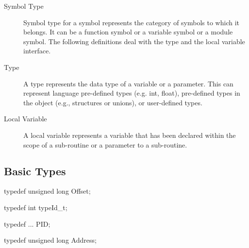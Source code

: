 \begin{description}
\item[Symbol Type] Symbol type for a symbol represents the category of symbols to which it belongs. It can be a function symbol or a variable symbol or a module symbol.
The following definitions deal with the type and the local variable interface.
\item[Type] A type represents the data type of a variable or a parameter. This can represent language pre-defined types (e.g. int, float), pre-defined types in the object (e.g., structures or unions), or user-defined types.
\item[Local Variable] A local variable represents a variable that has been declared within the scope of a sub-routine or a parameter to a sub-routine.
\end{description}

\subsection{Basic Types}

\begin{apient}
typedef unsigned long Offset;
\end{apient}
\begin{apient}
typedef int typeId_t;
\end{apient}
\begin{apient}
typedef ... PID;
\end{apient}
\begin{apient}
typedef unsigned long Address;
\end{apient}
